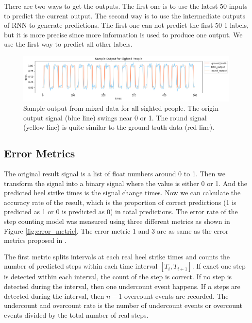 \documentclass[11pt]{article}
\begin{document}
{There are two ways to get the outputs. The first one is to use the latest 50 inputs to predict the current output. The second way is to use the intermediate outputs of RNN to generate predictions. The first one can not predict the first 50-1 labels, but it is more precise since more information is used to produce one output. We use the first way to predict all other labels.


\begin{figure}[ht]
\centering
\includegraphics[scale=0.5]{output_sighted}
\caption{Sample output from mixed data for all sighted people. The origin output signal (blue line) swings near 0 or 1. The round signal (yellow line) is quite similar to the ground truth data (red line).}
\label{fig:output_sighted}
\end{figure}



\subsection{Error Metrics}

The original result signal is a list of float numbers around 0 to 1. Then we transform the signal into a binary signal where the value is either 0 or 1. And the predicted heel strike times is the signal change times. Now we can calculate the accuracy rate of the result, which is the proportion of correct predictions (1 is predicted as 1 or 0 is predicted as 0) in total predictions. The error rate of the step counting model was measured using three different metrics as shown in Figure \ref{fig:error_metric}. The error metric 1 and 3 are as same as the error metrics proposed in \cite{flores2016weallwalk}.

The first metric splits intervals at each real heel strike times and counts the number of predicted steps within each time interval $[T_i, T_{i+1}]$.  If exact one step is detected within each interval, the count of the step is correct. If no step is detected during the interval, then one undercount event happens. If $n$ steps are detected during the interval, then $n-1$ overcount events are recorded. The undercount and overcount rate is the number of undercount events or overcount events divided by the total number of real steps.

}
\end{document}
